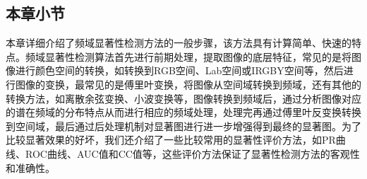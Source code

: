 \subsection{本章小节}
\label{2_5_5}

本章详细介绍了频域显著性检测方法的一般步骤，该方法具有计算简单、快速的特点。频域显著性检测算法首先进行前期处理，提取图像的底层特征，常见的是将图像进行颜色空间的转换，如转换到RGB空间、Lab空间或IRGBY空间等，然后进行图像的变换，最常见的是傅里叶变换，将图像从空间域转换到频域，还有其他的转换方法，如离散余弦变换、小波变换等，图像转换到频域后，通过分析图像对应的谱在频域的分布特点从而进行相应的频域处理，处理完再通过傅里叶反变换转换到空间域，最后通过后处理机制对显著图进行进一步增强得到最终的显著图。为了比较显著效果的好坏，我们还介绍了一些比较常用的显著性评价方法，如PR曲线、ROC曲线、AUC值和CC值等，这些评价方法保证了显著性检测方法的客观性和准确性。
